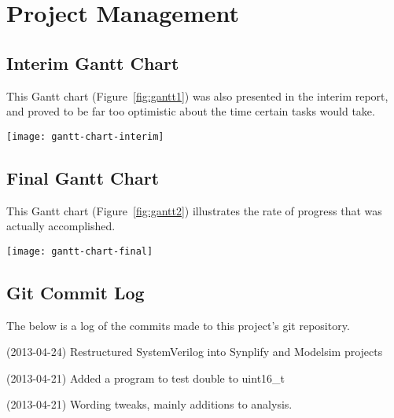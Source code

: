 \chapter{Project Management} %
\label{apdx:project_mang}

\section{Interim Gantt Chart} %
\label{apdx:gantt_chart1}
	This Gantt chart (Figure~\ref{fig:gantt1}) was also presented in the interim report, and proved to be far too optimistic about the time certain tasks would take.
	\begin{sidewaysfigure}[tb]
		\begin{center}
			\texttt{[image: gantt-chart-interim]}
		\end{center}
		\caption{Interim Gantt chart}
		\label{fig:gantt1}
	\end{sidewaysfigure}

	\clearpage

\section{Final Gantt Chart} %
\label{apdx:gantt_chart2}
	This Gantt chart (Figure~\ref{fig:gantt2}) illustrates the rate of progress that was actually accomplished.
	\begin{sidewaysfigure}[tb]
		\begin{center}
			\texttt{[image: gantt-chart-final]}
		\end{center}
		\caption{Final Gantt chart}
		\label{fig:gantt2}
	\end{sidewaysfigure}

	\clearpage


\section{Git Commit Log} %
\label{apdx:git_commit_log}
The below is a log of the commits made to this project's git repository.

(2013-04-24) Restructured SystemVerilog into Synplify and Modelsim projects

(2013-04-21) Added a program to test double to uint16\_t

(2013-04-21) Wording tweaks, mainly additions to analysis.

